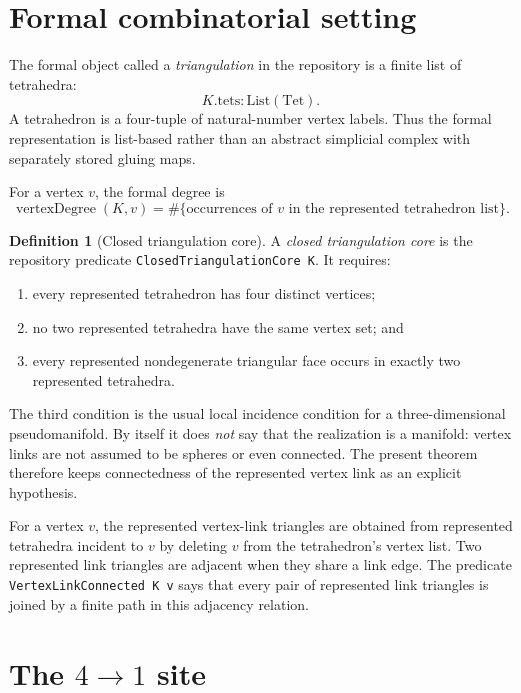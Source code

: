 \documentclass[11pt]{article}
\theoremstyle{definition}
\newtheorem{definition}[theorem]{Definition}
\theoremstyle{remark}
\begin{document}
\section{Formal combinatorial setting}

The formal object called a \emph{triangulation} in the repository is a finite
list of tetrahedra:
\[
  K.\mathrm{tets} : \mathrm{List}(\mathrm{Tet}).
\]
A tetrahedron is a four-tuple of natural-number vertex labels.  Thus the
formal representation is list-based rather than an abstract simplicial
complex with separately stored gluing maps.

For a vertex $v$, the formal degree is
\[
  \operatorname{vertexDegree}(K,v)
  =
  \#\{\text{occurrences of }v\text{ in the represented tetrahedron list}\}.
\]

\begin{definition}[Closed triangulation core]
A \emph{closed triangulation core} is the repository predicate
\texttt{\small ClosedTriangulationCore K}.  It requires:
\begin{enumerate}[label=(\roman*)]
  \item every represented tetrahedron has four distinct vertices;
  \item no two represented tetrahedra have the same vertex set; and
  \item every represented nondegenerate triangular face occurs in exactly
        two represented tetrahedra.
\end{enumerate}
\end{definition}

The third condition is the usual local incidence condition for a
three-dimensional pseudomanifold.  By itself it does \emph{not} say that
the realization is a manifold: vertex links are not assumed to be spheres
or even connected.  The present theorem therefore keeps connectedness of
the represented vertex link as an explicit hypothesis.

For a vertex $v$, the represented vertex-link triangles are obtained from
represented tetrahedra incident to $v$ by deleting $v$ from the tetrahedron's
vertex list.  Two represented link triangles are adjacent when they share a
link edge.  The predicate \texttt{\small VertexLinkConnected K v} says that every
pair of represented link triangles is joined by a finite path in this
adjacency relation.

\section{The $4\to1$ site}
\end{document}

